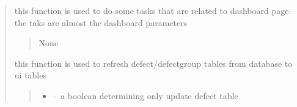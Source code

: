 \documentclass[letterpaper,10pt,english]{sphinxmanual}
\begin{document}
\begin{quote}
\begin{savenotes}
\begin{fulllineitems}
\begin{savenotes}
\begin{fulllineitems}
\begin{quote}
\begin{description}
\end{description}\end{quote}

\end{fulllineitems}\end{savenotes}


\begin{savenotes}\begin{fulllineitems}
\label{\detokenize{setting/setting_api:oxin.setting_api.API.refresh_dashboard_page}}
\pysigstartsignatures
{}
\pysigstopsignatures
\sphinxAtStartPar
this function is used to do some tasks that are related to dashboard page.
the taks are almost the dashboard parameters
\begin{quote}\begin{description}
\sphinxAtStartPar
None

\end{description}\end{quote}

\end{fulllineitems}\end{savenotes}


\begin{savenotes}\begin{fulllineitems}
\label{\detokenize{setting/setting_api:oxin.setting_api.API.refresh_defects_table}}
\pysigstartsignatures
{}
\pysigstopsignatures
\sphinxAtStartPar
this function is used to refresh defect/defect\sphinxhyphen{}group tables from database to ui tables
\begin{quote}\begin{description}
\begin{itemize}
\item {} 
\sphinxAtStartPar
{} – a boolean determining only update defect table


\end{itemize}
\end{description}
\end{quote}
\end{fulllineitems}
\end{savenotes}
\end{fulllineitems}
\end{savenotes}
\end{quote}
\end{document}

